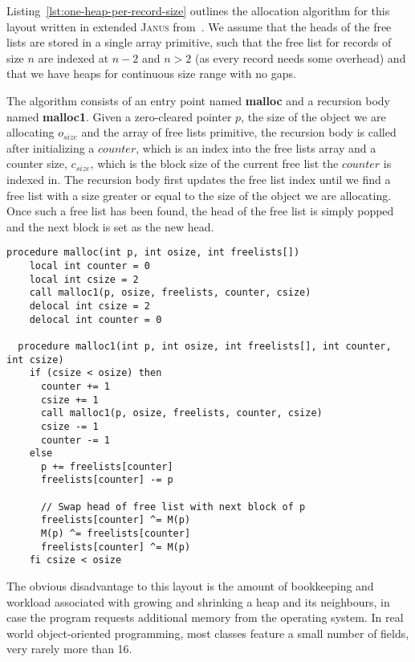 Listing~\ref{lst:one-heap-per-record-size} outlines the allocation algorithm for this layout written in extended \textsc{Janus} from~\cite{ty:ejanus}. We assume that the heads of the free lists are stored in a single array primitive, such that the free list for records of size $n$ are indexed at $n-2$ and $n > 2$ (as every record needs some overhead) and that we have heaps for continuous size range with no gaps.

The algorithm consists of an entry point named \textbf{malloc} and a recursion body named \textbf{malloc1}. Given a zero-cleared pointer $p$, the size of the object we are allocating $o_{size}$ and the array of free lists primitive, the recursion body is called after initializing a $counter$, which is an index into the free lists array and a counter size, $c_{size}$, which is the block size of the current free list the $counter$ is indexed in. The recursion body first updates the free list index until we find a free list with a size greater or equal to the size of the object we are allocating. Once such a free list has been found, the head of the free list is simply popped and the next block is set as the new head.\\

\begin{lstlisting}[caption={Allocation algorithm for one heap per record size implemented in extended Janus}, language=janus, style=basic, label={lst:one-heap-per-record-size}]
  procedure malloc(int p, int osize, int freelists[])
    local int counter = 0
    local int csize = 2
    call malloc1(p, osize, freelists, counter, csize)
    delocal int csize = 2
    delocal int counter = 0

  procedure malloc1(int p, int osize, int freelists[], int counter, int csize)
    if (csize < osize) then
      counter += 1
      csize += 1
      call malloc1(p, osize, freelists, counter, csize) 
      csize -= 1
      counter -= 1
    else
      p += freelists[counter]
      freelists[counter] -= p

      // Swap head of free list with next block of p 
      freelists[counter] ^= M(p)
      M(p) ^= freelists[counter]
      freelists[counter] ^= M(p)
    fi csize < osize   
\end{lstlisting}

The obvious disadvantage to this layout is the amount of bookkeeping and workload associated with growing and shrinking a heap and its neighbours, in case the program requests additional memory from the operating system. In real world object-oriented programming, most classes feature a small number of fields, very rarely more than 16. 

